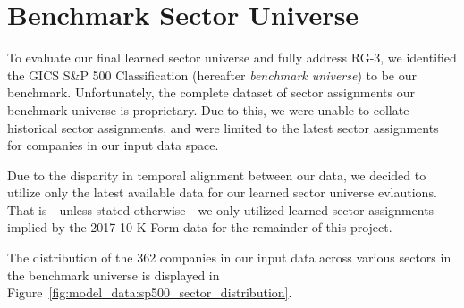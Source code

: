 \documentclass[../main.tex]{subfiles}
\begin{document}
\section{Benchmark Sector Universe}

To evaluate our final learned sector universe and fully address RG-3, we identified the GICS S\&P 500 Classification (hereafter \textit{benchmark universe}) to be our benchmark. Unfortunately, the complete dataset of sector assignments our benchmark universe is proprietary. Due to this, we were unable to collate historical sector assignments, and were limited to the latest sector assignments for companies in our input data space.

Due to the disparity in temporal alignment between our data, we decided to utilize only the latest available data for our learned sector universe evlautions. That is - unless stated otherwise - we only utilized learned sector assignments implied by the 2017 10-K Form data for the remainder of this project.

The distribution of the 362 companies in our input data across various sectors in the benchmark universe is displayed in Figure~\ref{fig:model_data:sp500_sector_distribution}.
\end{document}

